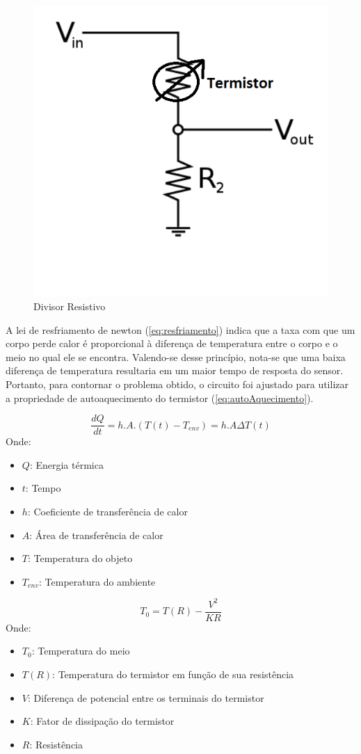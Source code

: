 \begin{figure}[h!]
	\begin{center}
 		\includegraphics[width=0.3\linewidth]{images/divisor_resistivo.png}
 		\caption{Divisor Resistivo}
 		\label{fig:divisorResistivo}
 	\end{center}
\end{figure}
 
A lei de resfriamento de newton (\ref{eq:resfriamento}) indica que a taxa com que um corpo perde calor é proporcional à diferença de temperatura entre o corpo e o meio  no qual ele se encontra. Valendo-se desse princípio, nota-se que uma baixa diferença de temperatura resultaria em um maior tempo de resposta do sensor. Portanto, para contornar o problema obtido, o circuito foi ajustado para utilizar a propriedade de autoaquecimento do termistor (\ref{eq:autoAquecimento}). 
 
  
\begin{equation} \label{eq:resfriamento}
	\dfrac{dQ}{dt} = h.A.(T(t) - T_{env}) = h.A \Delta T(t)	
\end{equation}
Onde:
\begin{itemize}[label=]
	\item $Q$: Energia térmica
	\item $t$: Tempo
	\item $h$: Coeficiente de transferência de calor
	\item $A$: Área de transferência de calor
	\item $T$: Temperatura do objeto
	\item $T_{env}$: Temperatura do ambiente
\end{itemize}
 
\begin{equation} \label{eq:autoAquecimento}
	T_0 = T(R) - \dfrac{V^2}{KR}
\end{equation}
Onde:
\begin{itemize}[label=]
	\item $T_0$: Temperatura do meio
 	\item $T(R)$: Temperatura do termistor em função de sua resistência
 	\item $V$: Diferença de potencial entre os terminais do termistor
 	\item $K$: Fator de dissipação do termistor
 	\item $R$: Resistência
\end{itemize}
 
